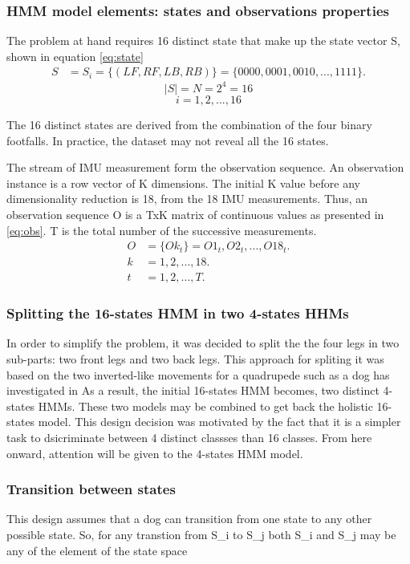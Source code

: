 \subsubsection{HMM model elements: states and observations properties}
The problem at hand requires 16 distinct state that make up the state vector S, shown in equation \ref{eq:state}
\begin{align} \label{eq:state}
S &= {S_i} = \{(LF, RF, LB, RB)\} = \{0000, 0001, 0010, ..., 1111\}.
\end{align}
\[|S| = N = 2^4 = 16\]
\[i = 1, 2, ..., 16\]

The 16 distinct states are derived from the combination of the four binary footfalls. In practice, the dataset may not reveal all the 16 states.

The stream of IMU measurement form the observation sequence. An observation instance is a row vector of K dimensions. The initial K value before any dimensionality reduction is 18, from the 18 IMU measurements.
Thus, an observation sequence O is a TxK matrix of continuous values as presented in \ref{eq:obs}. T is the total number of the successive measurements.
\begin{align} \label{eq:obs}
O &= \{Ok_t\} = O1_t, O2_t, ..., O18_t. \\
k &= 1, 2, ..., 18. \\
t &= 1, 2, ..., T.
\end{align}


\subsubsection{Splitting the 16-states HMM in two 4-states HHMs}
In order to simplify the problem, it was decided to split the the four legs in two sub-parts: two front legs and two back legs. This approach for spliting it was based on the two inverted-like movements for a quadrupede such as a dog has investigated in %
As a result, the initial 16-states HMM becomes, two distinct 4-states HMMs. These two models may be combined to get back the holistic 16-states model. 
This design decision was motivated by the fact that it is a simpler task to dsicriminate between 4 distinct classses than 16 classes. From here onward, attention will be given to the 4-states HMM model.
 
\subsubsection{Transition between states}
This design assumes that a dog can transition from one state to any other possible state. So, for any transtion from S\_{i} to S\_{j} both S\_{i} and S\_{j} may be any of the element of the state space 

